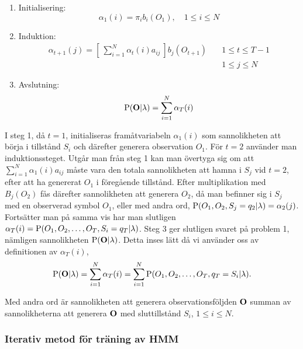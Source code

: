 \documentclass[../rapport_MVEX01-11-05]{subfiles}
\begin{document}
\begin{enumerate}
\item Initialisering:
\begin{equation*}
\alpha_1(i) = \pi_ib_i(O_1), \quad 1\leq i \leq N
\end{equation*}

\item Induktion:
\begin{align*}
\alpha_{t+1}(j) =
\left[~\sum_{i=1}^N\alpha_t(i)a_{ij}~\right]b_j(O_{t+1}) \quad &1 \leq t \leq T-1 \\
&1 \leq j \leq N
\end{align*}

\item Avslutning:
\begin{equation*}
\mathrm{P}(\mathbf{O}|\lambda) = \sum_{i=1}^N\alpha_T(i)
\end{equation*}
\end{enumerate}

I steg 1, då $t=1$, initialiseras framåtvariabeln $\alpha_1(i)$ som
sannolikheten att börja i tillstånd $S_i$ och därefter generera
observation $O_1$. För $t=2$ använder man induktionssteget. Utgår man
från steg 1 kan man övertyga sig om att
$\sum_{i=1}^N\alpha_1(i)a_{ij}$ måste vara den totala sannolikheten
att hamna i $S_j$ vid $t=2$, efter att ha genererat $O_1$ i föregående
tillstånd. Efter multiplikation med $B_j(O_{2})$ fås därefter
sannolikheten att generera $O_2$, då man befinner sig i $S_j$ med en
observerad symbol $O_1$, eller med andra ord, $\mathrm{P}(O_1,O_2,S_j
= q_2 | \lambda) = \alpha_2(j)$. Fortsätter man på samma vis har man
slutligen $\alpha_T(i) = \mathrm{P}(O_1,O_2,\dots,O_T,S_i = q_T |
\lambda)$. Steg 3 ger slutligen svaret på problem 1, nämligen
sannolikheten $\mathrm{P}(\mathbf{O}|\lambda)$. Detta inses lätt då vi
använder oss av definitionen av $\alpha_T(i)$, 
\begin{equation*}
\mathrm{P}(\mathbf{O}|\lambda) = \sum_{i=1}^N\alpha_T(i) =
\sum_{i=1}^N\mathrm{P}(O_1,O_2,\dots,O_T,q_T = S_i|\lambda). 
\end{equation*} 

Med andra ord är sannolikheten att generera observationsföljden
$\mathbf{O}$ summan av sannolikheterna att generera $\mathbf{O}$ med
sluttillstånd $S_i$, $1 \leq i \leq N$.

\subsubsection{Iterativ metod för träning av HMM}
\end{document}
